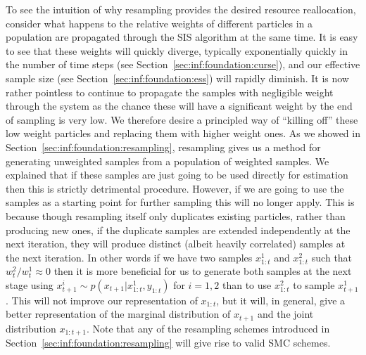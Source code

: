 To see the intuition of why resampling provides the desired resource reallocation, consider what happens 
to the relative weights of different particles in a population are propagated through the SIS algorithm at the
same time.  It is easy to see that these weights will quickly diverge, typically exponentially quickly in the
number of time steps (see Section~\ref{sec:inf:foundation:curse}), and our effective sample size 
(see Section~\ref{sec:inf:foundation:ess}) will rapidly diminish.  It is now rather pointless to continue to
propagate the samples with negligible weight through the system as the chance these will have a significant
weight by the end of sampling is very low.  We therefore desire a principled way of ``killing off'' these
low weight particles and replacing them with higher weight ones.  As we showed in Section~\ref{sec:inf:foundation:resampling},
resampling gives us a method for generating unweighted samples from a population of weighted samples.
We explained that if these samples are just going to be used directly for estimation then this is strictly
detrimental procedure.  However, if we are going to use the samples as a starting point for further sampling this
will no longer apply.  This is because though resampling itself only duplicates existing particles, rather
than producing new ones, if the duplicate samples are extended independently at the next iteration, they will
produce distinct (albeit heavily correlated) samples at the next iteration.  In other words if we have two samples
$x_{1:t}^1$ and $x_{1:t}^2$ such that $w_t^2/w_t^1 \approx 0$ then it is more beneficial for us to generate both
samples at the next stage using $x_{t+1}^i \sim p(x_{t+1} | x_{1:t}^1, y_{1:t})$ for $i=1,2$ than to use
$x_{1:t}^2$ to sample $x_{t+1}^1$.  This will not improve our representation of $x_{1:t}$, but it will, in
general, give a better representation of the marginal distribution of $x_{t+1}$ and the joint distribution
$x_{1:t+1}$.   Note that any of the resampling schemes introduced in Section~\ref{sec:inf:foundation:resampling}
will give rise to valid SMC schemes.

